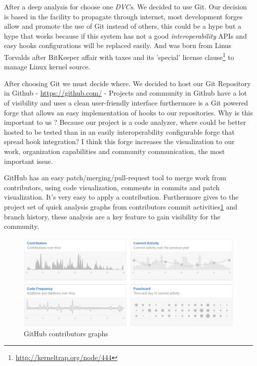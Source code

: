 \documentclass[11pt]{scrartcl}
\begin{document}
\par After a deep analysis for choose one \emph{DVCs}. We decided to use Git. Our decision is based in the facility to propagate through internet, most development forges allow and promote the use of Git instead of others, this could be a hype but a hype that works because if this system has not a good \emph{interoperability} APIs and easy hooks configurations will be replaced easily. And was born from Linus Torvalds after BitKeeper affair with taxes and its 'special' license clause\footnote{\url{http://kerneltrap.org/node/444}} to manage Linux kernel source.

\par After choosing Git we must decide where. We decided to host our Git Repository in Github - \url{https://github.com/} - Projects and community in Github have a lot of visibility and uses a clean user-friendly interface furthermore is a Git powered forge that allows an easy implementation of hooks to our repositories. Why is this important to us ? Because our project is a code analyzer, where could be better hosted to be tested than in an easily interoperability configurable forge that spread hook integration? I think this forge increases the visualization to our work, organization capabilities and community communication, the most important issue. 

\par GitHub has an easy patch/merging/pull-request tool to merge work from contributors, using code visualization, comments in commits and patch visualization. It's very easy to apply a contribution. Furthermore gives to the project set of quick analysis graphs from contributors commit activities\ref{github-graphs} and branch history, these analysis are a key feature to gain visibility for the community.

\begin{figure}[H]
\centering
\includegraphics[width=1\textwidth]{github-graphs.png}
\caption{GitHub contributors graphs}
\label{github-graphs}
\end{figure}
\end{document}
